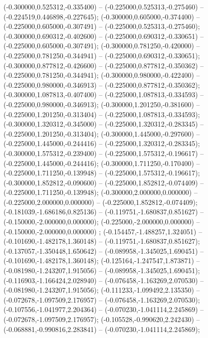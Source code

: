  (-0.300000,0.525312,-0.335400) -- (-0.225000,0.525313,-0.275460) -- (-0.224519,0.446898,-0.227645);
 (-0.300000,0.605000,-0.374400) -- (-0.225000,0.605000,-0.307491) -- (-0.225000,0.525313,-0.275460);
 (-0.300000,0.690312,-0.402600) -- (-0.225000,0.690312,-0.330651) -- (-0.225000,0.605000,-0.307491);
 (-0.300000,0.781250,-0.420000) -- (-0.225000,0.781250,-0.344941) -- (-0.225000,0.690312,-0.330651);
 (-0.300000,0.877812,-0.426600) -- (-0.225000,0.877812,-0.350362) -- (-0.225000,0.781250,-0.344941);
 (-0.300000,0.980000,-0.422400) -- (-0.225000,0.980000,-0.346913) -- (-0.225000,0.877812,-0.350362);
 (-0.300000,1.087813,-0.407400) -- (-0.225000,1.087813,-0.334593) -- (-0.225000,0.980000,-0.346913);
 (-0.300000,1.201250,-0.381600) -- (-0.225000,1.201250,-0.313404) -- (-0.225000,1.087813,-0.334593);
 (-0.300000,1.320312,-0.345000) -- (-0.225000,1.320312,-0.283345) -- (-0.225000,1.201250,-0.313404);
 (-0.300000,1.445000,-0.297600) -- (-0.225000,1.445000,-0.244416) -- (-0.225000,1.320312,-0.283345);
 (-0.300000,1.575312,-0.239400) -- (-0.225000,1.575312,-0.196617) -- (-0.225000,1.445000,-0.244416);
 (-0.300000,1.711250,-0.170400) -- (-0.225000,1.711250,-0.139948) -- (-0.225000,1.575312,-0.196617);
 (-0.300000,1.852812,-0.090600) -- (-0.225000,1.852812,-0.074409) -- (-0.225000,1.711250,-0.139948);
 (-0.300000,2.000000,0.000000) -- (-0.225000,2.000000,0.000000) -- (-0.225000,1.852812,-0.074409);
 (-0.181039,-1.686186,0.825136) -- (-0.119751,-1.680837,0.851627) -- (-0.150000,-2.000000,0.000000);
 (-0.225000,-2.000000,0.000000) -- (-0.150000,-2.000000,0.000000) ;
 (-0.154457,-1.488257,1.324051) -- (-0.101690,-1.482178,1.360148) -- (-0.119751,-1.680837,0.851627);
 (-0.137057,-1.350448,1.650642) -- (-0.089958,-1.345025,1.690451) -- (-0.101690,-1.482178,1.360148);
 (-0.125164,-1.247547,1.873871) -- (-0.081980,-1.243207,1.915056) -- (-0.089958,-1.345025,1.690451);
 (-0.116903,-1.166424,2.028940) -- (-0.076458,-1.163269,2.070530) -- (-0.081980,-1.243207,1.915056);
 (-0.111233,-1.099492,2.135350) -- (-0.072678,-1.097509,2.176957) -- (-0.076458,-1.163269,2.070530);
 (-0.107556,-1.041977,2.204364) -- (-0.070230,-1.041114,2.245869) -- (-0.072678,-1.097509,2.176957);
 (-0.105528,-0.990620,2.242430) -- (-0.068881,-0.990816,2.283841) -- (-0.070230,-1.041114,2.245869);
